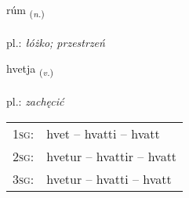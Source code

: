 \documentclass[frontgrid, backgrid]{flacards}\usepackage[]{graphicx}\usepackage[]{xcolor}
\begin{document}
\renewcommand{\blhead}{\vskip5pt {\small\bfseries\footnotesize Nafnorð | rzeczownik }}
\renewcommand{\bcfoot}{\vskip5pt \hspace{2pt}{\small\bfseries\footnotesize 1K}}


{rúm \small{\textsubscript{(\textit{n.})}} \\[1ex] %
\textphonetic{[ruːm]} \\
pl.: \emph{łóżko; przestrzeń} \\  [2ex]
\renewcommand*{\arraystretch}{0.8}
}

\renewcommand{\flhead}{\vskip5pt \fboxsep=0pt {\small\bfseries\footnotesize Sagnorð | czasownik}}
\renewcommand{\fcfoot}{\vskip5pt \fboxsep=0pt \hspace{2pt}{\small\bfseries\footnotesize 1K}}

\renewcommand{\blhead}{\vskip5pt {\small\bfseries\footnotesize Sagnorð | czasownik }}
\renewcommand{\bcfoot}{\vskip5pt \hspace{2pt}{\small\bfseries\footnotesize 1K}}


{hvetja \small{\textsubscript{(\textit{v.})}} \\[1ex] %
\textphonetic{[kʰvɛːtja]} \\
pl.: \emph{zachęcić} \\  [2ex]
\renewcommand*{\arraystretch}{0.8}
\begin{tabular}{p{1cm}l}
\textsc{1sg}: & hvet -- hvatti -- hvatt \\ 
\textsc{2sg}: & hvetur -- hvattir -- hvatt \\ 
\textsc{3sg}: & hvetur -- hvatti -- hvatt \\ 
\end{tabular}
}

\renewcommand{\flhead}{\vskip5pt \fboxsep=0pt {\small\bfseries\footnotesize Sagnorð | czasownik}}
\renewcommand{\fcfoot}{\vskip5pt \fboxsep=0pt \hspace{2pt}{\small\bfseries\footnotesize 1K}}
\end{document}
